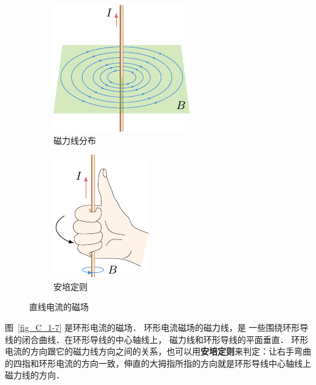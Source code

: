 \begin{figure}[htbp]
	\centering
	\begin{subfigure}{0.4\linewidth}
		\centering
		\includegraphics{fig/C/1-6a.pdf}
		\caption{磁力线分布}\label{fig_C_1-6a}
	\end{subfigure}
	\hfil
	\begin{subfigure}{0.4\linewidth}
		\centering
		\includegraphics{fig/C/1-6b.pdf}
		\caption{安培定则}\label{fig_C_1-6b}
	\end{subfigure}
	\caption{直线电流的磁场}\label{fig_C_1-6}
\end{figure}




图~\ref{fig_C_1-7} 是环形电流的磁场．
环形电流磁场的磁力线，是
一些围绕环形导线的闭合曲线．在环形导线的中心轴线上，
磁力线和环形导线的平面垂直．
环形电流的方向跟它的磁力线方向之间的关系，也可以用\textbf{安培定则}来判定：让右手弯曲的四指和环形电流的方向一致，伸直的大拇指所指的方向就是环形导线中心轴线上磁力线的方向．

